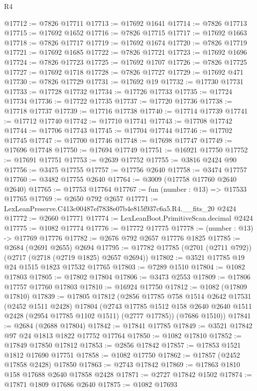 \begin{lexlean}{R4}
\begin{coremodule}
@17712 := @7826 @17711
@17713 := @17692 @1641
@17714 := @7826 @17713
@17715 := @17692 @1652
@17716 := @7826 @17715
@17717 := @17692 @1663
@17718 := @7826 @17717
@17719 := @17692 @1674
@17720 := @7826 @17719
@17721 := @17692 @1685
@17722 := @7826 @17721
@17723 := @17692 @1696
@17724 := @7826 @17723
@17725 := @17692 @1707
@17726 := @7826 @17725
@17727 := @17692 @1718
@17728 := @7826 @17727
@17729 := @17692 @471
@17730 := @7826 @17729
@17731 := @17692 @19
@17732 := @17730 @17731
@17733 := @17728 @17732
@17734 := @17726 @17733
@17735 := @17724 @17734
@17736 := @17722 @17735
@17737 := @17720 @17736
@17738 := @17718 @17737
@17739 := @17716 @17738
@17740 := @17714 @17739
@17741 := @17712 @17740
@17742 := @17710 @17741
@17743 := @17708 @17742
@17744 := @17706 @17743
@17745 := @17704 @17744
@17746 := @17702 @17745
@17747 := @17700 @17746
@17748 := @17698 @17747
@17749 := @17696 @17748
@17750 := @17694 @17749
@17751 := @16921 @17750
@17752 := @17691 @17751
@17753 := @2639 @17752
@17755 := @3816 @2424 @90
@17756 := @3475 @17755
@17757 := @17756 @2640
@17758 := @3474 @17757
@17760 := @3482 @17755 @2640
@17764 := @3009 (@17758 @17760 @2640 @2640)
@17765 := @17753 @17764
@17767 := fun (number : @13) => @17533 @17765
@17769 := @2650 @792 @2657
@17771 := LexLeanPreserve.C413c00487ef7838e07b4e815f937c6a5.R4.__fits_20 @2424
@17772 := @2660 @17771
@17774 := LexLeanBoot.PrimitiveScan.decimal @2424
@17775 := @1082 @17774
@17776 := @17772 @17775
@17778 := (number : @13) -> @17769 @17776
@17782 := @2676 @792 @2657 @17776 @1825
@17785 := @2684 (@2691 @2655) @2694
@17795 := @17782 @17785 (@2701 (@2711 @792)) (@2717 (@2718 (@2719 @1825) @2657 @2694))
@17802 := @3521 @17785 @19 @24 @1515 @1823 @17532 @17765
@17803 := @7289 @1510
@17804 := @1082 @17803
@17805 := @17802 @17804
@17806 := @3473 @2553
@17809 := @17806 @17757 @17760 @17803
@17810 := @16924 @17750
@17812 := @1082 (@17809 @17810)
@17839 := @17805
    @17812
    (@2856
      @17785
      @758
      @1514
      @2642
      @17531
      (@2452 @1511 @2428)
      @17804
      (@2743 @17785 @1512 @158 @2640 @2640 @1511 @2428 (@2954 @17785 @1102 @1511) (@2777 @17785))
      (@7686 @1510))
@17841 := @2684 (@2688 @17804)
@17842 := @17841 @17785
@17849 := @3521 @17842 @97 @24 @1813 @1822 @17752 @17764
@17850 := @1082 @17810
@17852 := @17849 @17850 @17812
@17853 := @2856 @17842
@17857 := @17853 @1521 @1812 @17690 @17751
@17858 := @1082 @17750
@17862 := @17857 (@2452 @17858 @2428) @17850
@17863 := @2743 @17842
@17869 := @17863 @1810 @158 @17688 @2640 @17858 @2428
@17871 := @2727 @17842 @1502
@17874 := @17871 @1809 @17686 @2640
@17875 := @1082 @17693

\end{coremodule}
\end{lexlean}
